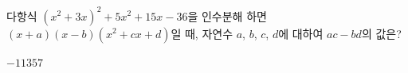 다항식 $(x^2+3x)^2+5x^2+15x-36$을 인수분해 하면 $(x+a)(x-b)(x^2+cx+d)$일 때, 자연수 $a$, $b$, $c$, $d$에 대하여 $ac-bd$의 값은?
\begin{choices32}{$-1$}{$1$}{$3$}{$5$}{$7$}\end{choices32}
